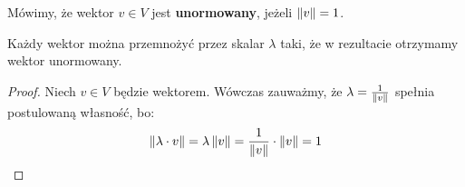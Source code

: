 \begin{definition}
	Mówimy, że wektor \(v \in V\) jest \textbf{unormowany}, jeżeli \(\left\Vert v \right\Vert = 1\).
\end{definition}
\begin{fact}
	Każdy wektor można przemnożyć przez skalar \(\lambda\) taki, że w rezultacie otrzymamy wektor unormowany.
\end{fact}
\begin{proof}
	Niech \(v \in V\) będzie wektorem. Wówczas zauważmy, że \(\lambda = \frac{1}{\left\Vert v \right\Vert}\) spełnia postulowaną własność, bo:
	\[
		\left\Vert \lambda \cdot v \right\Vert = \lambda \left\Vert v \right\Vert = \frac{1}{\left\Vert v \right\Vert} \cdot \left\Vert v \right\Vert = 1
	\]
\end{proof}



